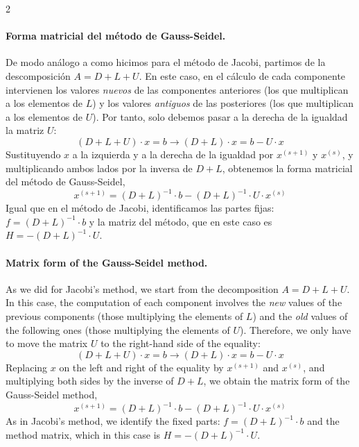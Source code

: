 \begin{paracol}{2}
\paragraph{Forma matricial del método de Gauss-Seidel.}  De modo análogo a como hicimos para el método de Jacobi, partimos de la descomposición $A=D+L+U$. En este caso, en el cálculo de cada componente intervienen los valores \emph{nuevos} de las componentes anteriores (los que multiplican a los elementos de $L$) y los valores \emph{antiguos} de las posteriores (los que multiplican a los elementos de $U$). Por tanto, solo debemos pasar a la derecha de la igualdad la matriz $U$:
\begin{equation*}
(D+L+U)\cdot x=b \rightarrow (D+L)\cdot x= b-U\cdot x
\end{equation*}
Sustituyendo $x$ a la izquierda y a la derecha de la igualdad por $x^{(s+1)}$ y $x^{(s)}$, y multiplicando ambos lados por la inversa de $D+L$, obtenemos la forma matricial del método de Gauss-Seidel,
\begin{equation*}
x^{(s+1)}= (D+L)^{-1}\cdot b-(D+L)^{-1}\cdot U\cdot x^{(s)}
\end{equation*}
Igual que en el método de Jacobi, identificamos las partes fijas: $f=(D+L)^{-1}\cdot b$ y la matriz del método, que en este caso es $H=-(D+L)^{-1}\cdot U$.

\switchcolumn
\paragraph{Matrix form of the Gauss-Seidel method.}  As we did for Jacobi's method, we start from the decomposition $A=D+L+U$. In this case, the computation of each component involves the \emph{new} values of the previous components (those multiplying the elements of $L$) and the \emph{old} values of the following ones (those multiplying the elements of $U$). Therefore, we only have to move the matrix $U$ to the right-hand side of the equality:
\begin{equation*}
(D+L+U)\cdot x=b \rightarrow (D+L)\cdot x= b-U\cdot x
\end{equation*}
Replacing $x$ on the left and right of the equality by $x^{(s+1)}$ and $x^{(s)}$, and multiplying both sides by the inverse of $D+L$, we obtain the matrix form of the Gauss-Seidel method,
\begin{equation*}
x^{(s+1)}= (D+L)^{-1}\cdot b-(D+L)^{-1}\cdot U\cdot x^{(s)}
\end{equation*}
As in Jacobi's method, we identify the fixed parts: $f=(D+L)^{-1}\cdot b$ and the method matrix, which in this case is $H=-(D+L)^{-1}\cdot U$.


\end{paracol}
